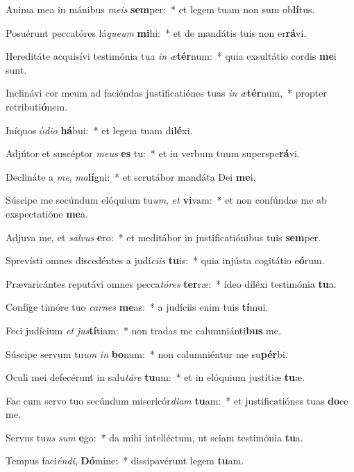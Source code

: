 \item Anima mea in mánibus \textit{me}\textit{is} \textbf{sem}per:~* et legem tuam non sum ob\textbf{lí}tus.
\item Posuérunt peccatóres lá\textit{que}\textit{um} \textbf{mi}hi:~* et de mandátis tuis non er\textbf{rá}vi.
\item Hereditáte acquisívi testimónia tua \textit{in} \textit{æ}\textbf{tér}num:~* quia exsultátio cordis \textbf{me}i sunt.
\item Inclinávi cor meum ad faciéndas justificatiónes tuas \textit{in} \textit{æ}\textbf{tér}num,~* propter retributi\textbf{ó}nem.
\item Iníquos ó\textit{di}\textit{o} \textbf{há}bui:~* et legem tuam di\textbf{lé}xi.
\item Adjútor et suscéptor \textit{me}\textit{us} \textbf{es} tu:~* et in verbum tuum superspe\textbf{rá}vi.
\item Declináte a \textit{me}, \textit{ma}\textbf{lí}gni:~* et scrutábor mandáta Dei \textbf{me}i.
\item Súscipe me secúndum elóquium tu\textit{um}, \textit{et} \textbf{vi}vam:~* et non confúndas me ab exspectatióne \textbf{me}a.
\item Adjuva me, et \textit{sal}\textit{vus} \textbf{e}ro:~* et meditábor in justificatiónibus tuis \textbf{sem}per.
\item Sprevísti omnes discedéntes a judí\textit{ci}\textit{is} \textbf{tu}is:~* quia injústa cogitátio e\textbf{ó}rum.
\item Prævaricántes reputávi omnes pecca\textit{tó}\textit{res} \textbf{ter}ræ:~* ídeo diléxi testimónia \textbf{tu}a.
\item Confíge timóre tuo \textit{car}\textit{nes} \textbf{me}as:~* a judíciis enim tuis \textbf{tí}mui.
\item Feci judícium \textit{et} \textit{jus}\textbf{tí}tiam:~* non tradas me calumniánti\textbf{bus} me.
\item Súscipe servum tu\textit{um} \textit{in} \textbf{bo}num:~* non calumniéntur me su\textbf{pér}bi.
\item Oculi mei defecérunt in salu\textit{tá}\textit{re} \textbf{tu}um:~* et in elóquium justítiæ \textbf{tu}æ.
\item Fac cum servo tuo secúndum misericór\textit{di}\textit{am} \textbf{tu}am:~* et justificatiónes tuas \textbf{do}ce me.
\item Servus tu\textit{us} \textit{sum} \textbf{e}go:~* da mihi intelléctum, ut sciam testimónia \textbf{tu}a.
\item Tempus faci\textit{én}\textit{di}, \textbf{Dó}mine:~* dissipavérunt legem \textbf{tu}am.
